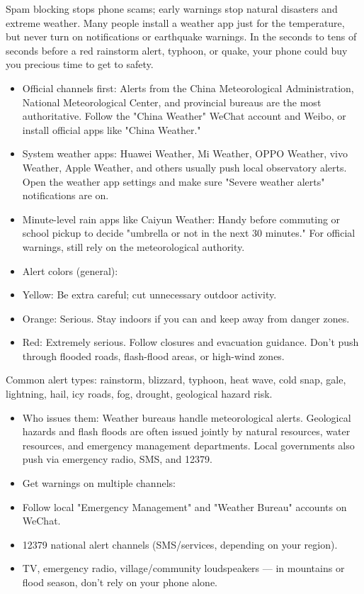 
Spam blocking stops phone scams; early warnings stop natural disasters and extreme weather. Many people install a weather app just for the temperature, but never turn on notifications or earthquake warnings. In the seconds to tens of seconds before a red rainstorm alert, typhoon, or quake, your phone could buy you precious time to get to safety.


\begin{itemize}
  \item Official channels first: Alerts from the China Meteorological Administration, National Meteorological Center, and provincial bureaus are the most authoritative. Follow the "China Weather" WeChat account and Weibo, or install official apps like "China Weather."
  \item System weather apps: Huawei Weather, Mi Weather, OPPO Weather, vivo Weather, Apple Weather, and others usually push local observatory alerts. Open the weather app settings and make sure "Severe weather alerts" notifications are on.
  \item Minute-level rain apps like Caiyun Weather: Handy before commuting or school pickup to decide "umbrella or not in the next 30 minutes." For official warnings, still rely on the meteorological authority.
  \item Alert colors (general):
  \item Yellow: Be extra careful; cut unnecessary outdoor activity.
  \item Orange: Serious. Stay indoors if you can and keep away from danger zones.
  \item Red: Extremely serious. Follow closures and evacuation guidance. Don't push through flooded roads, flash-flood areas, or high-wind zones.
\end{itemize}

Common alert types: rainstorm, blizzard, typhoon, heat wave, cold snap, gale, lightning, hail, icy roads, fog, drought, geological hazard risk.


\begin{itemize}
  \item Who issues them: Weather bureaus handle meteorological alerts. Geological hazards and flash floods are often issued jointly by natural resources, water resources, and emergency management departments. Local governments also push via emergency radio, SMS, and 12379.
  \item Get warnings on multiple channels:
  \item Follow local "Emergency Management" and "Weather Bureau" accounts on WeChat.
  \item 12379 national alert channels (SMS/services, depending on your region).
  \item TV, emergency radio, village/community loudspeakers — in mountains or flood season, don't rely on your phone alone.
\end{itemize}


